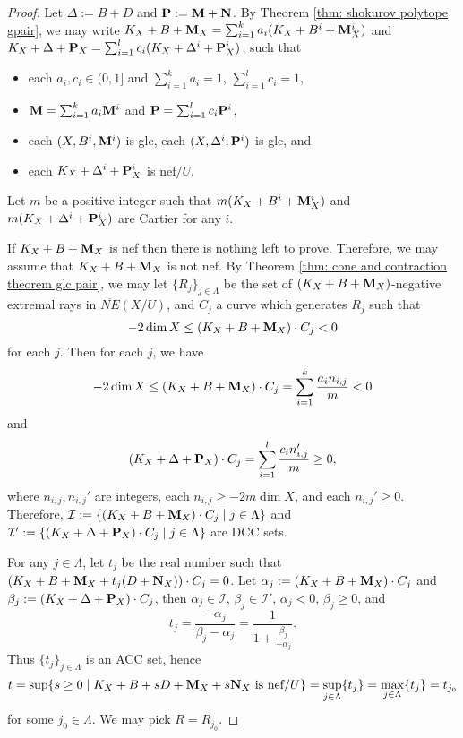 \documentclass[11pt]{amsart}
\numberwithin{equation}{section}
\newcommand{\Mm}{{\bf{M}}}
\newcommand{\PP}{{\bf{P}}}
\newcommand{\NN}{{\bf{N}}}
\newcommand{\Ii}{\mathcal{I}}
\theoremstyle{definition}
\theoremstyle{definition}
\theoremstyle{definition}
\begin{document}
\begin{proof}
Let $\Delta:=B+D$ and $\PP:=\Mm+\NN$. By Theorem \ref{thm: shokurov polytope gpair}, we may write $K_X+B+\Mm_X=\sum_{i=1}^ka_i(K_X+B^i+\Mm_X^i)$ and $K_X+\Delta+\PP_X=\sum_{i=1}^lc_i(K_X+\Delta^i+\PP_X^i)$, such that 
\begin{itemize}
    \item each $a_i,c_i\in (0,1]$ and $\sum_{i=1}^ka_i=1$, $\sum_{i=1}^lc_i=1$,
    \item $\Mm=\sum_{i=1}^ka_i\Mm^i$ and $\PP=\sum_{i=1}^lc_i\PP^i$,
    \item  each $(X,B^i,\Mm^i)$ is glc, each $(X,\Delta^i,\PP^i)$ is glc, and
    \item each $K_X+\Delta^i+\PP^i_X$ is nef$/U$.
\end{itemize}
Let $m$ be a positive integer such that $m(K_X+B^i+\Mm^i_X)$ and $m(K_X+\Delta^i+\PP_X^i)$ are Cartier for any $i$. 

If $K_X+B+\Mm_X$ is nef then there is nothing left to prove. Therefore, we may assume that $K_X+B+\Mm_X$ is not nef. By Theorem \ref{thm: cone and contraction theorem glc pair}, we may let $\{R_j\}_{j\in\Lambda}$ be the set of $(K_X+B+\Mm_X)$-negative extremal rays in $\overline{NE}(X/U)$, and $C_j$ a curve which generates $R_j$ such that $$-2\dim X\leq (K_X+B+\Mm_X)\cdot C_j<0$$ 
for each $j$. Then for each $j$, we have
$$-2\dim X\leq (K_X+B+\Mm_X)\cdot C_j=\sum_{i=1}^k\frac{a_in_{i,j}}{m}<0$$
and
$$(K_X+\Delta+\PP_X)\cdot C_j=\sum_{i=1}^l\frac{c_in'_{i,j}}{m}\geq 0,$$
where $n_{i,j},n_{i,j}'$ are integers, each $n_{i,j}\geq -2m\dim X$, and each $n_{i,j}'\geq 0$. Therefore, $\Ii:=\{(K_X+B+\Mm_X)\cdot C_j\mid j\in\Lambda\}$ and  $\Ii':=\{(K_X+\Delta+\PP_X)\cdot C_j\mid j\in\Lambda\}$ are DCC sets. 

For any $j\in\Lambda$, let $t_j$ be the real number such that $(K_X+B+\Mm_X+t_j(D+\NN_X))\cdot C_j=0$. Let $\alpha_j:=(K_X+B+\Mm_X)\cdot C_j$ and $\beta_j:=(K_X+\Delta+\PP_X)\cdot C_j$, then $\alpha_j\in\Ii$, $\beta_j\in\Ii'$, $\alpha_j<0$, $\beta_j\geq 0$, and
$$t_j=\frac{-\alpha_j}{\beta_j-\alpha_j}=\frac{1}{1+\frac{\beta_j}{-\alpha_j}}.$$
Thus $\{t_j\}_{j\in\Lambda}$ is an ACC set, hence
$$t=\sup\{s\geq 0\mid K_X+B+sD+\Mm_X+s\NN_X\text{ is nef}/U\}=\sup_{j\in\Lambda}\{t_j\}=\max_{j\in\Lambda}\{t_j\}=t_{j_0}$$
for some $j_0\in\Lambda$. We may pick $R=R_{j_0}$.
\end{proof}
\end{document}
